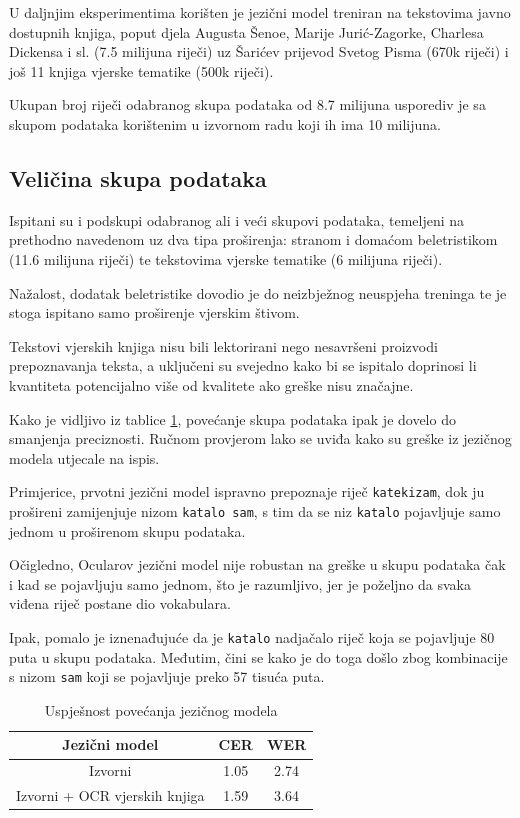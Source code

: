 \documentclass[zavrsnirad]{fer}
\begin{document}
U daljnjim eksperimentima korišten je jezični model treniran na tekstovima javno dostupnih knjiga, poput djela Augusta Šenoe, Marije Jurić-Zagorke, Charlesa Dickensa i sl. (7.5 milijuna riječi) uz Šarićev prijevod Svetog Pisma (670k riječi) i još 11 knjiga vjerske tematike (500k riječi). 

Ukupan broj riječi odabranog skupa podataka od 8.7 milijuna usporediv je sa skupom podataka korištenim u izvornom radu koji ih ima 10 milijuna.

\subsection{Veličina skupa podataka}

Ispitani su i podskupi odabranog ali i veći skupovi podataka, temeljeni na prethodno navedenom uz dva tipa proširenja: stranom i domaćom beletristikom (11.6 milijuna riječi) te tekstovima vjerske tematike (6 milijuna riječi). 

Nažalost, dodatak beletristike dovodio je do neizbježnog neuspjeha treninga te je stoga ispitano samo proširenje vjerskim štivom.

Tekstovi vjerskih knjiga nisu bili lektorirani nego nesavršeni proizvodi prepoznavanja teksta, a uključeni su svejedno kako bi se ispitalo doprinosi li kvantiteta potencijalno više od kvalitete ako greške nisu značajne.

Kako je vidljivo iz tablice \ref{tab:lm_performance}, povećanje skupa podataka ipak je dovelo do smanjenja preciznosti. Ručnom provjerom lako se uviđa kako su greške iz jezičnog modela utjecale na ispis.

Primjerice, prvotni jezični model ispravno prepoznaje riječ \texttt{katekizam}, dok ju prošireni zamijenjuje nizom \texttt{katalo sam}, s tim da se niz \texttt{katalo} pojavljuje samo jednom u proširenom skupu podataka.

Očigledno, Ocularov jezični model nije robustan na greške u skupu podataka čak i kad se pojavljuju samo jednom, što je razumljivo, jer je poželjno da svaka viđena riječ postane dio vokabulara.

Ipak, pomalo je iznenađujuće da je \texttt{katalo} nadjačalo riječ koja se pojavljuje 80 puta u skupu podataka. Međutim, čini se kako je do toga došlo zbog kombinacije s nizom \texttt{sam} koji se pojavljuje preko 57 tisuća puta.



\bgroup
\def\arraystretch{1.25}
\begin{table}[h]
	\centering
	\begin{tabular}{|c|c|c|}
		\hline
		 \textbf{Jezični model} & \textbf{CER} & \textbf{WER} \\ \hline
		 Izvorni & 1.05 & 2.74 \\ \hline
		 Izvorni + OCR vjerskih knjiga & 1.59 & 3.64 \\ \hline
	\end{tabular}
	\caption{Uspješnost povećanja jezičnog modela}
	\label{tab:lm_performance}
\end{table}
\egroup
\end{document}
